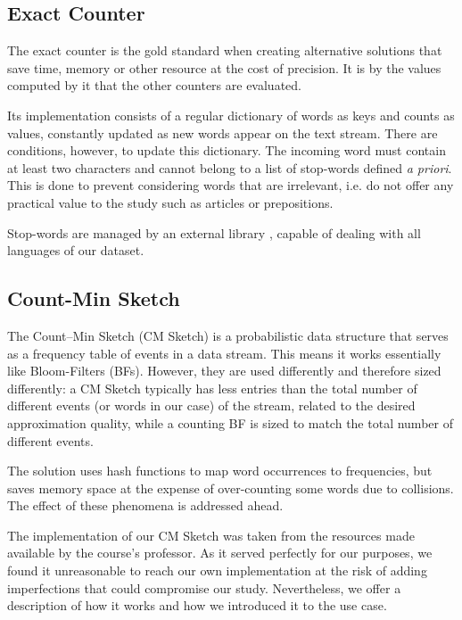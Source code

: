 \documentclass[shortpaper]{revdetua}
\begin{document}
\subsection{Exact Counter}

The exact counter is the gold standard when creating alternative solutions that save time, memory or other resource at the cost of precision.
It is by the values computed by it that the other counters are evaluated.

Its implementation consists of a regular dictionary of words as keys and counts as values, constantly updated as new words appear on the text stream.
There are conditions, however, to update this dictionary.
The incoming word must contain at least two characters and cannot belong to a list of stop-words defined \textit{a priori}.
This is done to prevent considering words that are irrelevant, i.e. do not offer any practical value to the study such as articles or prepositions.

Stop-words are managed by an external library \cite{stop-words}, capable of dealing with all languages of our dataset. 

\subsection{Count-Min Sketch}

The Count–Min Sketch (CM Sketch) is a probabilistic data structure that serves as a frequency table of events in a data stream.
This means it works essentially like Bloom-Filters (BFs).
However, they are used differently and therefore sized differently: 
a CM Sketch typically has less entries than the total number of different events (or words in our case) of the stream, related to the desired approximation 
quality, while a counting BF is sized to match the total number of different events. 

The solution uses hash functions to map word occurrences to frequencies, but saves memory space at the expense of over-counting some words due to collisions.
The effect of these phenomena is addressed ahead.
\newline

The implementation of our CM Sketch was taken from the resources made available by the course's professor.
As it served perfectly for our purposes, we found it unreasonable to reach our own implementation at the risk of adding imperfections that could compromise our study.
Nevertheless, we offer a description of how it works and how we introduced it to the use case.
\end{document}

